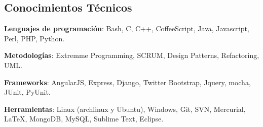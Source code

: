 \documentclass[margin,line]{resume}
\begin{document}
\begin{resume}
    \newpage
    \section{\mysidestyle Conocimientos Técnicos} 

	\textbf{Lenguajes de programación}: Bash, C, C++, CoffeeScript, Java, Javascript, Perl, PHP, Python.

	\textbf{Metodologías}: Extremme Programming, SCRUM, Design Patterns, Refactoring, UML.

	\textbf{Frameworks}: AngularJS, Express, Django, Twitter Bootstrap, Jquery, mocha,  JUnit, PyUnit.

	\textbf{Herramientas}: Linux (archlinux y Ubuntu), Windows, Git, SVN, Mercurial, \LaTeX , MongoDB, MySQL, Sublime Text, Eclipse.

\end{resume}
\end{document}
